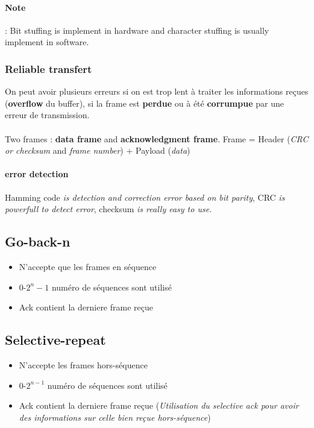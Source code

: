 \documentclass{report}
\begin{document}
\paragraph{Note} : Bit stuffing is implement in hardware and character stuffing is usually
implement in software.

\subsubsection{Reliable transfert}

On peut avoir plusieurs erreurs si on est trop lent à traiter les informations reçues
(\textbf{overflow} du buffer), si la frame est \textbf{perdue} ou à été \textbf{corrumpue}
par une erreur de transmission.

\paragraph{}
Two frames : \textbf{data frame} and \textbf{acknowledgment frame}.
Frame = Header (\textit{CRC or checksum} and \textit{frame number}) + Payload (\textit{data})

\paragraph{error detection}
 Hamming code \textit{is detection and correction error based on bit parity}, CRC 
 \textit{is powerfull to detect error}, checksum \textit{is really easy to use}.

\begin{multicols}{2} 
\subsection{Go-back-n}
\begin{itemize}
    \item N'accepte que les frames en séquence
    \item 0-$2^n -1$ numéro de séquences sont utilisé
    \item Ack contient la derniere frame reçue
\end{itemize}

\subsection{Selective-repeat}
\begin{itemize}
    \item N'accepte les frames hors-séquence
    \item 0-$2^{n-1}$ numéro de séquences sont utilisé
    \item Ack contient la derniere frame reçue (\textit{Utilisation du selective ack pour
            avoir des informations sur celle bien reçue hors-séquence})
\end{itemize}

\end{multicols}
\end{document}
